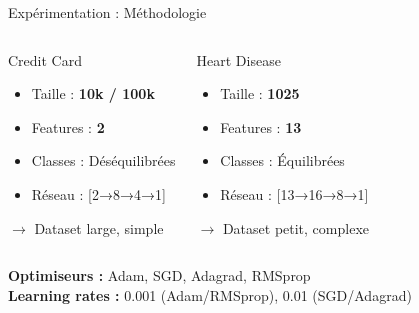 \documentclass{beamer}
\begin{document}
\begin{frame}{Expérimentation : Méthodologie}

\begin{columns}[T]

\begin{block}{Credit Card}
\small
\begin{itemize}
  \item Taille : \textbf{10k / 100k}
  \item Features : \textbf{2} 
  \item Classes : Déséquilibrées
  \item Réseau : {[}2→8→4→1{]}
\end{itemize}
\textcolor{mygreen}{$\rightarrow$ Dataset large, simple}
\end{block}

\begin{block}{Heart Disease}
\small
\begin{itemize}
  \item Taille : \textbf{1025}
  \item Features : \textbf{13}
  \item Classes : Équilibrées
  \item Réseau : {[}13→16→8→1{]}
\end{itemize}
\textcolor{mygreen}{$\rightarrow$ Dataset petit, complexe}
\end{block}

\end{columns}

\vspace{0.5cm}

\textbf{Optimiseurs :} Adam, SGD, Adagrad, RMSprop \\
\textbf{Learning rates :} 0.001 (Adam/RMSprop), 0.01 (SGD/Adagrad)

\end{frame}
\end{document}
